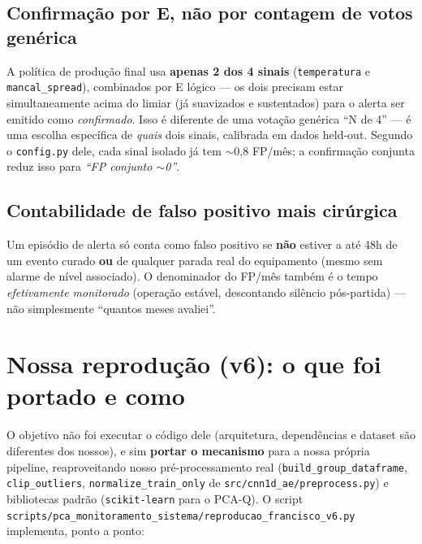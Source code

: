 \documentclass[11pt,a4paper]{article}
\begin{document}
\subsection{Confirmação por E, não por contagem de votos genérica}

A política de produção final usa \textbf{apenas 2 dos 4 sinais}
(\texttt{temperatura} e \texttt{mancal\_spread}), combinados por E lógico
--- os dois precisam estar simultaneamente acima do limiar (já
suavizados e sustentados) para o alerta ser emitido como
\emph{confirmado}. Isso é diferente de uma votação genérica ``N de 4''
--- é uma escolha específica de \emph{quais} dois sinais, calibrada em
dados held-out. Segundo o \texttt{config.py} dele, cada sinal isolado já
tem $\sim$0,8 FP/mês; a confirmação conjunta reduz isso para
\emph{``FP conjunto $\sim$0''}.

\subsection{Contabilidade de falso positivo mais cirúrgica}

Um episódio de alerta só conta como falso positivo se \textbf{não}
estiver a até 48h de um evento curado \textbf{ou} de qualquer parada
real do equipamento (mesmo sem alarme de nível associado). O
denominador do FP/mês também é o tempo \emph{efetivamente monitorado}
(operação estável, descontando silêncio pós-partida) --- não
simplesmente ``quantos meses avaliei''.

\section{Nossa reprodução (v6): o que foi portado e como}

O objetivo não foi executar o código dele (arquitetura, dependências e
dataset são diferentes dos nossos), e sim \textbf{portar o mecanismo}
para a nossa própria pipeline, reaproveitando nosso pré-processamento
real (\texttt{build\_group\_dataframe}, \texttt{clip\_outliers},
\texttt{normalize\_train\_only} de \texttt{src/cnn1d\_ae/preprocess.py})
e bibliotecas padrão (\texttt{scikit-learn} para o PCA-Q). O script
\texttt{scripts/pca\_monitoramento\_sistema/reproducao\_francisco\_v6.py}
implementa, ponto a ponto:
\end{document}
